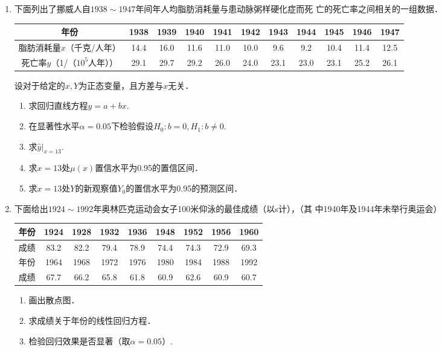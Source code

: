 \documentclass[10pt,a4paper]{article}
\begin{document}
\begin{enumerate}
    \item 下面列出了挪威人自$1938 \sim 1947$年间年人均脂肪消耗量与患动脉粥样硬化症而死
    亡的死亡率之间相关的一组数据．
    \renewcommand{\arraystretch}{1.3}
    \begin{table}[H]\centering
        \begin{tabular}{c|c|c|c|c|c|c|c|c|c|c}
        \hline
        年份                   & 1938 & 1939 & 1940 & 1941 & 1942 & 1943 & 1944 & 1945 & 1946 & 1947 \\ \hline
        脂肪消耗量$x$（千克/人年）      & 14.4 & 16.0 & 11.6 & 11.0 & 10.0 & 9.6  & 9.2  & 10.4 & 11.4 & 12.5 \\ \hline
        死亡率$y$（1/（$10^5$人年）） & 29.1 & 29.7 & 29.2 & 26.0 & 24.0 & 23.1 & 23.0 & 23.1 & 25.2 & 26.1 \\ \hline
        \end{tabular}
    \end{table}
    \renewcommand{\arraystretch}{1.0}
    设对于给定的$x,Y$为正态变量，且方差与$x$无关．
    \begin{enumerate}
        \item 求回归直线方程$y=a+bx$.
        \item 在显著性水平$\alpha=0.05$下检验假设$H_0:b=0,H_1:b\neq 0$.
        \item 求$\hat{y}|_{x=13}$.
        \item 求$x=13$处$\mu(x)$置信水平为0.95的置信区间．
        \item 求$x=13$处$Y$的新观察值$Y_0$的置信水平为0.95的预测区间．
    \end{enumerate}




    \item 下面给出$1924 \sim 1992$年奥林匹克运动会女子100米仰泳的最佳成绩（以s计），（其
    中1940年及1944年未举行奥运会）
    \renewcommand{\arraystretch}{1.3}
    \begin{table}[H]\centering
        \begin{tabular}{c|cccccccc}
        \hline
        年份 & 1924 & 1928 & 1932 & 1936 & 1948 & 1952 & 1956 & 1960 \\ \hline
        成绩 & 83.2 & 82.2 & 79.4 & 78.9 & 74.4 & 74.3 & 72.9 & 69.3 \\ \hline
        年份 & 1964 & 1968 & 1972 & 1976 & 1980 & 1984 & 1988 & 1992 \\ \hline
        成绩 & 67.7 & 66.2 & 65.8 & 61.8 & 60.9 & 62.6 & 60.9 & 60.7 \\ \hline
        \end{tabular}
    \end{table}
    \renewcommand{\arraystretch}{1.0}
    \begin{enumerate}
        \item 画出散点图．
        \item 求成绩关于年份的线性回归方程．
        \item 检验回归效果是否显著（取$\alpha=0.05$）.
    \end{enumerate}











  

\end{enumerate}
\end{document}
